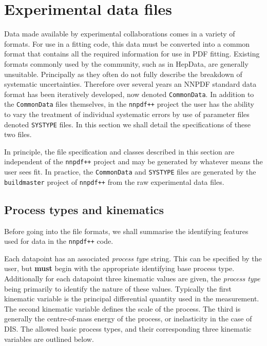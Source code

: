 \documentclass[11pt]{article}
\begin{document}
\section{Experimental data files}\label{sec:experimental}
Data made available by experimental collaborations comes in a variety of formats. For use in a fitting code, this data must be converted into a common format
that contains all the required information for use in PDF fitting. Existing formats commonly used by the community, such as in HepData, are generally unsuitable.
Principally as they often do not fully describe the breakdown of systematic uncertainties. Therefore over several years an NNPDF standard data format has been
iteratively developed, now denoted {\tt CommonData}. In addition to the {\tt CommonData} files themselves, in the {\tt nnpdf++} project the user has the ability to vary
the treatment of individual systematic errors by use of parameter files denoted {\tt SYSTYPE} files. In this section we shall detail the specifications of these two files.

In principle, the file specification and classes described in this section are independent of the {\tt nnpdf++} project and may be generated by whatever means the user sees fit.
In practice, the {\tt CommonData} and {\tt SYSTYPE} files are generated by the {\tt buildmaster} project of {\tt nnpdf++} from the raw experimental data files.

\subsection{Process types and kinematics}
Before going into the file formats, we shall summarise the identifying features used for data in the {\tt nnpdf++} code. 

Each datapoint has an associated \emph{process type} string. This can be specified by the user, but \textbf{must} begin with the appropriate identifying base process type. Additionally for each datapoint three kinematic values are given, the \emph{process type} being primarily to identify the nature of these values. Typically the first kinematic variable is the principal differential quantity used in the measurement. The second kinematic variable defines the scale of the process. The third is generally the centre-of-mass energy of the process, or inelasticity in the case of DIS. The allowed basic process types, and their corresponding three kinematic variables are outlined below.
\end{document}
